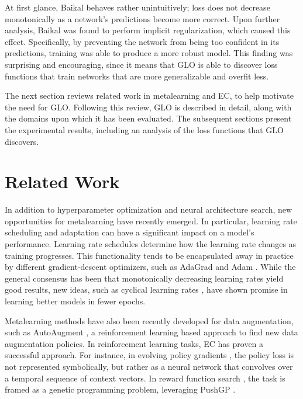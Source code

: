 \documentclass[conference]{IEEEtran}
\newcommand{\TECH}{GLO\xspace}
\begin{document}
At first glance, Baikal behaves rather unintuitively; loss does not decrease monotonically as a network's predictions become more correct. Upon further analysis, Baikal was found to perform implicit regularization, which caused this effect. Specifically, by preventing the network from being too confident in its predictions, training was able to produce a more robust model. This finding was surprising and encouraging, since it means that GLO is able to discover loss functions that train networks that are more generalizable and overfit less. 

The next section reviews related work in metalearning and EC, to help
motivate the need for \TECH. Following this review, \TECH is described in
detail, along with the domains upon which it has been evaluated. The
subsequent sections present the experimental results, including an
analysis of the loss functions that \TECH discovers.










\section{Related Work}

In addition to hyperparameter optimization and neural architecture
search, new opportunities for metalearning have recently emerged. In
particular, learning rate scheduling and adaptation can have a
significant impact on a model's performance. Learning rate schedules
determine how the learning rate changes as training progresses. This functionality tends to be encapsulated away in practice by different gradient-descent optimizers, such as AdaGrad \cite{adagrad} and Adam \cite{adam}. While the general consensus has been that monotonically decreasing learning rates yield good results, new ideas, such as cyclical learning rates \cite{smith2017cyclical}, have shown promise in learning better models in fewer epochs.

Metalearning methods have also been recently developed for data
augmentation, such as AutoAugment \cite{cubuk2018autoaugment}, a reinforcement learning based approach to find new data augmentation policies. In reinforcement
learning tasks, EC has proven a successful approach. For instance, in
evolving policy gradients \cite{houthooft2018evolved}, the policy loss is not represented
symbolically, but rather as a neural network that convolves over a
temporal sequence of context vectors. In reward function search \cite{niekum2010genetic},
the task is framed as a genetic programming problem, leveraging PushGP
\cite{push}. 
\end{document}
